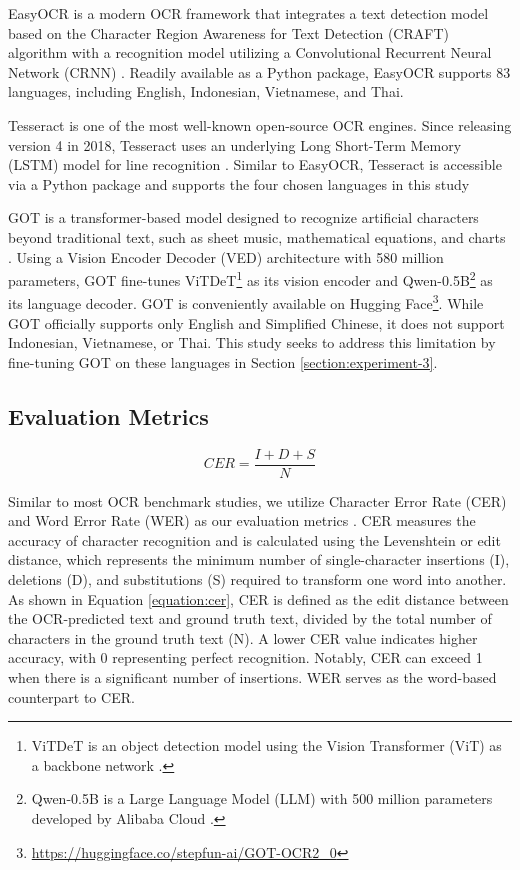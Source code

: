 \documentclass[12pt,oneside]{memoir}
\begin{document}
EasyOCR is a modern OCR framework that integrates a text detection model based on the Character Region Awareness for Text Detection (CRAFT) algorithm with a recognition model utilizing a Convolutional Recurrent Neural Network (CRNN) \parencite{easy-ocr-2025}.
Readily available as a Python package, EasyOCR supports 83 languages, including English, Indonesian, Vietnamese, and Thai.

Tesseract is one of the most well-known open-source OCR engines. Since releasing version 4 in 2018, Tesseract uses an underlying Long Short-Term Memory (LSTM) model for line recognition \parencite{tesseract-2025}.
Similar to EasyOCR, Tesseract is accessible via a Python package and supports the four chosen languages in this study 

GOT is a transformer-based model designed to recognize artificial characters beyond traditional text, such as sheet music, mathematical equations, and charts \parencite{wei-etal-2024}. 
Using a Vision Encoder Decoder (VED) architecture with 580 million parameters, GOT fine-tunes ViTDeT\footnote{ViTDeT is an object detection model using the Vision Transformer (ViT) as a backbone network \parencite{li-etal-2022}.} as its vision encoder and Qwen-0.5B\footnote{Qwen-0.5B is a Large Language Model (LLM) with 500 million parameters developed by Alibaba Cloud \parencite{qwen-2025}.} as its language decoder. 
GOT is conveniently available on Hugging Face\footnote{\url{https://huggingface.co/stepfun-ai/GOT-OCR2_0}}.
While GOT officially supports only English and Simplified Chinese, it does not support Indonesian, Vietnamese, or Thai. 
This study seeks to address this limitation by fine-tuning GOT on these languages in Section \ref{section:experiment-3}.

\subsection{Evaluation Metrics}

\begin{equation}
    CER = \frac{I + D + S}{N}
    \label{equation:cer}
\end{equation}

Similar to most OCR benchmark studies, we utilize Character Error Rate (CER) and 
Word Error Rate (WER) as our evaluation metrics \parencite{hegghammer-2022, ignat-etal-2022}. 
CER measures the accuracy of character recognition and is calculated using the Levenshtein or edit distance, which represents the minimum number of single-character insertions (I), deletions (D), 
and substitutions (S) required to transform one word into another. 
As shown in Equation \ref{equation:cer}, CER is defined as the edit distance between the OCR-predicted text and ground truth text, divided by the total number of characters in the ground truth text (N). 
A lower CER value indicates higher accuracy, with 0 representing perfect recognition. Notably, CER can exceed 1 when there is a significant number of insertions. WER serves as the word-based counterpart to CER.
\end{document}
